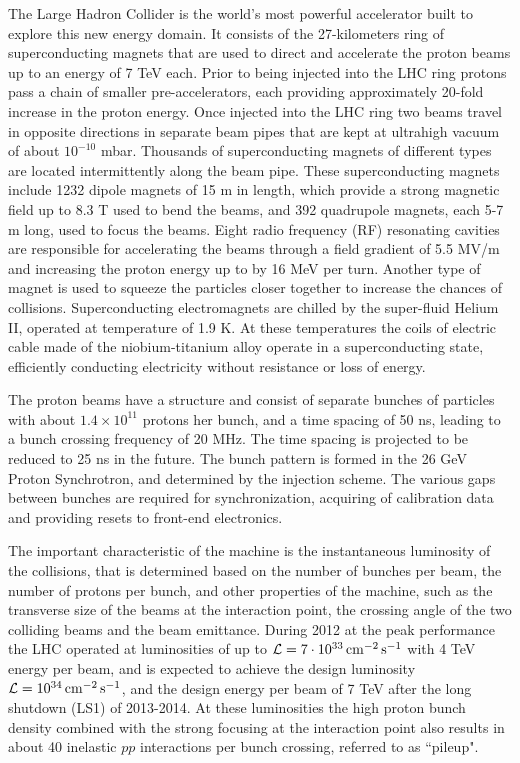 The Large Hadron Collider is the world's most powerful accelerator built to explore this new energy domain.
It consists of the 27-kilometers ring of superconducting magnets that are used to direct and accelerate the 
proton beams up to an energy of 7 TeV each. Prior to being injected into the LHC ring protons pass a chain of 
smaller pre-accelerators, each providing approximately 
20-fold increase in the proton energy.
Once injected into the LHC ring two beams travel in opposite directions in separate beam 
pipes that are kept at ultrahigh vacuum of about $10^{-10}$ mbar. 
Thousands of superconducting magnets of different  types are located intermittently along the beam pipe.
These superconducting magnets include 1232 dipole magnets of 15 m in length, which provide a strong magnetic 
field up to 8.3 T used to bend the beams, and 392 quadrupole magnets, each 5-7 m long, used to focus the beams. 
Eight radio frequency (RF) resonating cavities are responsible for accelerating the beams through a field
gradient of 5.5 MV/m and increasing the proton energy up to by 16 MeV per turn. 
Another type of magnet is used to squeeze the particles closer together to increase the chances of collisions.
Superconducting electromagnets are chilled by the super-fluid Helium II, operated at temperature of 1.9 K. 
At these temperatures the coils of electric cable made of the niobium-titanium alloy operate in a superconducting state, efficiently conducting electricity without resistance or loss of energy.

The proton beams have a structure and consist of separate bunches of particles with about $1.4 \times 10^{11}$ 
protons her bunch, and a time spacing of 50 ns, leading to a bunch crossing frequency of 20 MHz. 
The time spacing is projected to be reduced to 25 ns in the future.
The bunch pattern is formed in the 26 GeV Proton Synchrotron, and determined by the injection scheme.
The various gaps between bunches are required for synchronization, acquiring of calibration data and providing
resets to front-end electronics. 

The important characteristic of the machine is the instantaneous luminosity of the collisions, that is determined 
based on the number of bunches per beam, the number of protons per bunch, and other properties 
of the machine, such as the transverse size of the beams at the interaction point, the crossing angle 
of the two colliding beams and the beam emittance.
During 2012 at the peak performance the LHC operated at luminosities of up to ${\cal L} = 7 \cdot 10^{33} \,\mathrm{cm}^{-2}\, \mathrm{s}^{-1}$ with 4 TeV energy per beam, and is expected to achieve the design luminosity 
${\cal L} = 10^{34} \,\mathrm{cm}^{-2} \,\mathrm{s}^{-1}$, and the design energy per beam of 7 TeV
after the long shutdown (LS1) of 2013-2014. At these luminosities 
the high proton bunch density combined with the strong focusing at the interaction point also results 
in about 40 inelastic $pp$ interactions per bunch crossing, referred to as ``pileup". 

